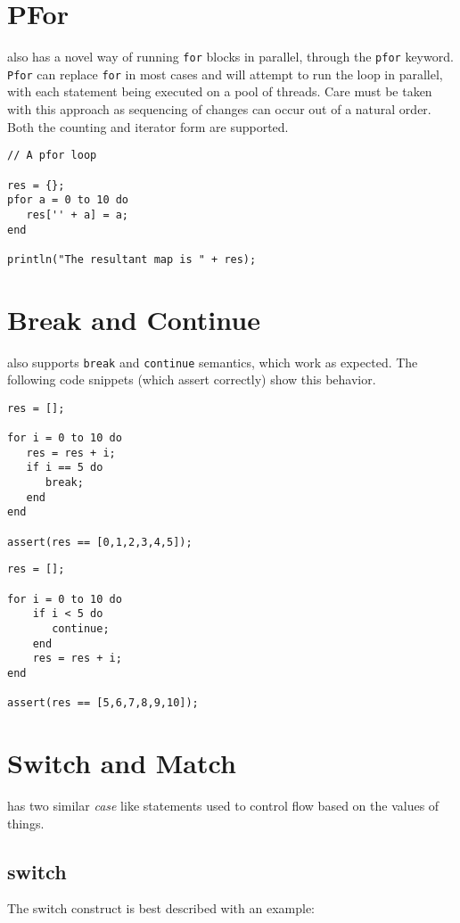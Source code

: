 \section{PFor}
\Reflex also has a novel way of running \Verb+for+ blocks in parallel, through the \verb+pfor+ keyword. \verb+Pfor+ can replace \verb+for+ in most cases and \Reflex will attempt to run the loop in parallel, with each statement being executed on a pool of threads. Care must be taken with this approach as sequencing of changes can occur out of a natural order. Both the counting and iterator form are supported.
\begin{lstlisting}[caption={PFor counting form}]
// A pfor loop

res = {};
pfor a = 0 to 10 do
   res['' + a] = a;
end

println("The resultant map is " + res);
\end{lstlisting}

\section{Break and Continue}
\Reflex also supports \Verb+break+ and \verb+continue+ semantics, which work as expected. The following code snippets (which assert correctly) show this behavior.
\begin{lstlisting}[caption={Break in for loop}]
res = [];

for i = 0 to 10 do
   res = res + i;
   if i == 5 do
      break;
   end
end

assert(res == [0,1,2,3,4,5]);
\end{lstlisting}

\begin{lstlisting}[caption={Continue in for loop}]
res = [];

for i = 0 to 10 do
    if i < 5 do
       continue;
    end
    res = res + i;
end

assert(res == [5,6,7,8,9,10]);
\end{lstlisting}

\section{Switch and Match}
\Reflex has two similar \emph{case} like statements used to control flow based on the values of things.
\subsection{switch}
The switch construct is best described with an example:

